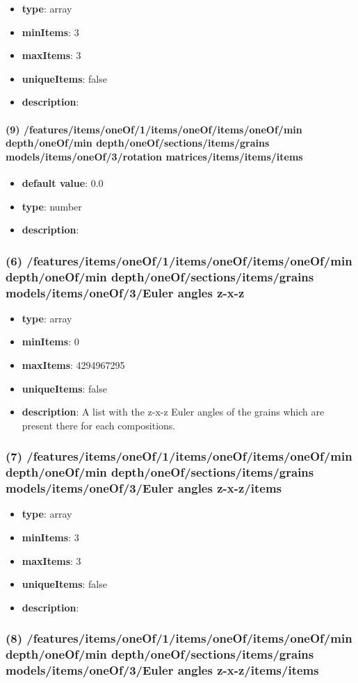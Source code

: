 \begin{itemize}[leftmargin=8em]\item {\bf type}: array
\item {\bf minItems}: 3
\item {\bf maxItems}: 3
\item {\bf uniqueItems}: false
\item {\bf description}: 
\end{itemize}\paragraph{(9) /features/items/oneOf/1/items/oneOf/items/oneOf/min depth/oneOf/min depth/oneOf/sections/items/grains models/items/oneOf/3/rotation matrices/items/items/items}
\begin{itemize}[leftmargin=9em]\item {\bf default value}: 0.0
\item {\bf type}: number
\item {\bf description}: 
\end{itemize}\subsubsection{(6) /features/items/oneOf/1/items/oneOf/items/oneOf/min depth/oneOf/min depth/oneOf/sections/items/grains models/items/oneOf/3/Euler angles z-x-z}
\begin{itemize}[leftmargin=6em]\item {\bf type}: array
\item {\bf minItems}: 0
\item {\bf maxItems}: 4294967295
\item {\bf uniqueItems}: false
\item {\bf description}: A list with the z-x-z Euler angles of the grains which are present there for each compositions.
\end{itemize}\subsubsection{(7) /features/items/oneOf/1/items/oneOf/items/oneOf/min depth/oneOf/min depth/oneOf/sections/items/grains models/items/oneOf/3/Euler angles z-x-z/items}
\begin{itemize}[leftmargin=7em]\item {\bf type}: array
\item {\bf minItems}: 3
\item {\bf maxItems}: 3
\item {\bf uniqueItems}: false
\item {\bf description}: 
\end{itemize}\subsubsection{(8) /features/items/oneOf/1/items/oneOf/items/oneOf/min depth/oneOf/min depth/oneOf/sections/items/grains models/items/oneOf/3/Euler angles z-x-z/items/items}
